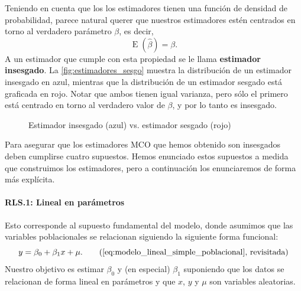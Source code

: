 \documentclass[12pt]{report}\usepackage[]{graphicx}\usepackage[]{color}
\newcommand*{\kw}[1]{\textbf{#1}\index{#1}}
\newcommand{\E}{\operatorname{E}}
\begin{document}
Teniendo en cuenta que los los estimadores tienen una función de densidad de probabilidad, parece natural querer que nuestros estimadores estén centrados en torno al verdadero parámetro $\beta$, es decir,
\begin{equation}
\E(\hat \beta) = \beta.
\end{equation}
A un estimador que cumple con esta propiedad se le llama \kw{ estimador insesgado}.
La \autoref{fig:estimadores_sesgo} muestra la distribución de un estimador insesgado en azul, mientras que la distribución de un estimador sesgado está graficada en rojo.
Notar que ambos tienen igual varianza, pero sólo el primero está centrado en torno al verdadero valor de $\beta$, y por lo tanto es insesgado.

\begin{figure}[htb]
  \centering
  \caption{Estimador insesgado (azul) vs. estimador sesgado (rojo)}
  \label{fig:estimadores_sesgo}
\end{figure}%

Para asegurar que los estimadores MCO que hemos obtenido son insesgados deben cumplirse cuatro supuestos.
Hemos enunciado estos supuestos a medida que construimos los estimadores, pero a continuación los enunciaremos de forma más explícita.

\paragraph{RLS.1: Lineal en parámetros} Esto corresponde al supuesto fundamental del modelo, donde asumimos que las variables poblacionales se relacionan siguiendo la siguiente forma funcional:
\begin{equation}
y = \beta_0 + \beta_1 x + \mu. \tag{\ref{eq:modelo_lineal_simple_poblacional}, revisitada}
\end{equation}
Nuestro objetivo es estimar $\beta_0$ y (en especial) $\beta_1$ suponiendo que los datos se relacionan de forma lineal en parámetros y que $x$, $y$ y $\mu$ son variables aleatorias.
\end{document}
